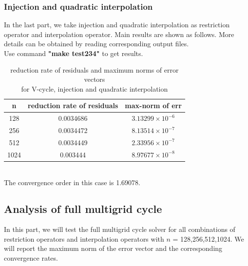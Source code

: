 \documentclass[a4paper,twocolumn]{article}
\theoremstyle{definition}
\begin{document}
\subsubsection{Injection and quadratic interpolation}
In the last part, we take injection and quadratic interpolation as restriction operator and interpolation operator. Main results are shown as follows. More details can be obtained by reading corresponding output files.\\
Use command \textbf{"make test234"} to get results.\\
\begin{table}[!htp]
	\centering
	\begin{tabular}{|c|c|c|}
		\hline	
		n &reduction rate of residuals & max-norm of err \\
		\hline		
		128 &0.0034686& $3.13299\times 10^{-6}$ \\
		\hline		
		256 &0.0034472& $8.13514\times 10^{-7}$ \\
		\hline		
		512 &0.0034449& $2.33956\times 10^{-7}$ \\
		\hline		
		1024 &0.003444& $8.97677\times 10^{-8}$ \\
		\hline
	\end{tabular}
	\caption{reduction rate of residuals and maximum norms of error vectors \\for V-cycle, injection and quadratic interpolation}
\end{table}\\
The convergence order in this case is 1.69078.
\subsection{Analysis of full multigrid cycle}
In this part, we will test the full multigrid cycle solver for all combinations of restriction operators and interpolation operators with $n$ = 128,256,512,1024. We will report the maximum norm of the error vector and the corresponding convergence rates.
\end{document}
